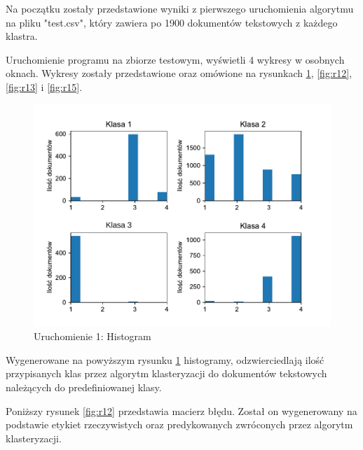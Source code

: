     Na początku zostały przedstawione wyniki z pierwszego uruchomienia algorytmu na pliku "test.csv", który zawiera po 1900 dokumentów tekstowych z każdego klastra.
    
    Uruchomienie programu na zbiorze testowym, wyświetli 4 wykresy w osobnych oknach. Wykresy zostały przedstawione oraz omówione na rysunkach \ref{fig:r11}, \ref{fig:r12}, \ref{fig:r13} i \ref{fig:r15}.
    
    \begin{figure}[h!]
        \centering
        \includegraphics[scale=0.8]{Rysunki/Rozdzial3/edited_run11.pdf}
        \caption{Uruchomienie 1: Histogram}
        \label{fig:r11}
    \end{figure}
    
    Wygenerowane na powyższym rysunku \ref{fig:r11} histogramy, odzwierciedlają ilość przypisanych klas przez algorytm klasteryzacji do dokumentów tekstowych należących do predefiniowanej klasy.
    
    Poniższy rysunek \ref{fig:r12} przedstawia macierz błędu. Został on wygenerowany na podstawie etykiet rzeczywistych oraz predykowanych zwróconych przez algorytm klasteryzacji.
    
